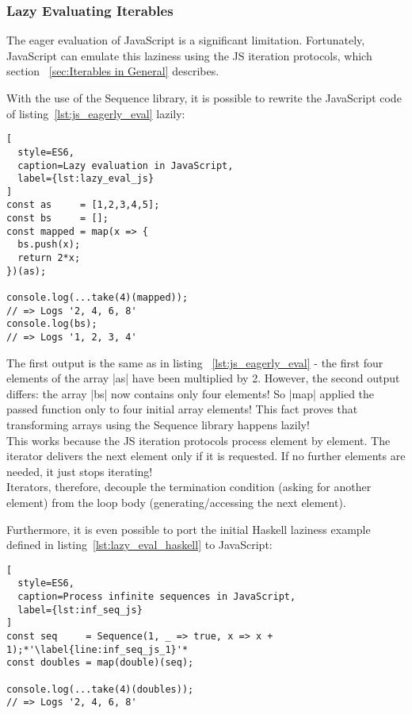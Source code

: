 \subsubsection{Lazy Evaluating Iterables} %
\label{subsub:Lazy Evaluate Iterables}

The eager evaluation of JavaScript is a significant limitation. Fortunately,
JavaScript can emulate this laziness using the JS iteration protocols, which
section ~\ref{sec:Iterables in General} describes.

With the use of the Sequence library, it is possible to rewrite the JavaScript
code of listing~\ref{lst:js_eagerly_eval} lazily:

\begin{lstlisting}[
  style=ES6,
  caption=Lazy evaluation in JavaScript,
  label={lst:lazy_eval_js}
]
const as     = [1,2,3,4,5];
const bs     = [];
const mapped = map(x => {
  bs.push(x);
  return 2*x;
})(as);

console.log(...take(4)(mapped));
// => Logs '2, 4, 6, 8'
console.log(bs);
// => Logs '1, 2, 3, 4'
\end{lstlisting}
The first output is the same as in listing ~\ref{lst:js_eagerly_eval} - the
first four elements of the array |as| have been multiplied by 2. However, the
second output differs: the array |bs| now contains only four elements! So |map|
applied the passed function only to four initial array elements! This fact
proves that transforming arrays using the Sequence library happens lazily!\\
This works because the JS iteration protocols process element by element. The
iterator delivers the next element only if it is requested. If no further
elements are needed, it just stops iterating! \\
Iterators, therefore, decouple the termination condition (asking for another
element) from the loop body (generating/accessing the next element).

Furthermore, it is even possible to port the initial Haskell laziness
example defined in listing~\ref{lst:lazy_eval_haskell} to JavaScript:
\begin{lstlisting}[
  style=ES6,
  caption=Process infinite sequences in JavaScript,
  label={lst:inf_seq_js}
]
const seq     = Sequence(1, _ => true, x => x + 1);*'\label{line:inf_seq_js_1}'*
const doubles = map(double)(seq);

console.log(...take(4)(doubles));
// => Logs '2, 4, 6, 8'
\end{lstlisting}

